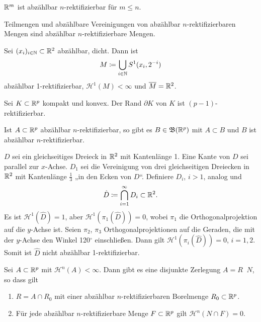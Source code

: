 \documentclass[a4paper,twoside,DIV15,BCOR12mm]{scrbook}
\newcommand{\borel}{\mathfrak B}
\newcommand{\HM}{\mathscr H}
\begin{document}
\begin{beispiele}
\item $\mathbb{R}^m$ ist abzählbar $n$-rektifizierbar für $m \le n$.
\item Teilmengen und abzählbare Vereinigungen von abzählbar $n$-rektifizierbaren Mengen sind abzählbar  $n$-rektifizierbare Mengen.
\item Sei $(x_i)_{i\in \mathbb{N}} \subset \mathbb{R}^2$ abzählbar, dicht. Dann  ist
\[
M \da \bigcup_{i\in\MdN} S^1(x_i,2^{-i})
\]
abzählbar 1-rektifizierbar, $\HM^1(M) <\infty$ und $\overline M = \mathbb{R}^2$.
\item Sei $K\subset \mathbb{R}^p$ kompakt und konvex. Der Rand $\partial K$ von $K$ ist $(p-1)$-rektifizierbar.
\item Ist $A\subset \mathbb{R}^p$ abzählbar $n$-rektifizierbar, so gibt es $B\in \borel(\MdR^p)$ mit $A\subset B$ und $B$ ist abzählbar $n$-rektifizierbar.
\item $D$ sei ein gleichseitiges Dreieck in $\mathbb{R}^2$ mit Kantenlänge 1. Eine Kante von $D$ sei parallel zur $x$-Achse. $D_1$ sei die Vereinigung von drei gleichseitigen Dreiecken in $\mathbb{R}^2$ mit Kantenlänge $\frac13$ „in den Ecken von $D$“. Definiere $D_i$, $i>1$, analog und 
\[
\hat D \da \bigcap_{i=1}^\infty D_i \subset \MdR^2.
\]
Es ist $\HM^1(\hat D)=1$, aber $\HM^1(\pi_1(\hat D))=0$, wobei $\pi_1$ die Orthogonalprojektion auf die $y$-Achse ist. Seien $\pi_2$, $\pi_3$ Orthogonalprojektionen auf die Geraden, die mit der $y$-Achse den Winkel 120$^\circ$ einschließen. Dann gilt $\HM^1(\pi_i(\hat D)) = 0$, $i=1,2$. Somit ist $\hat D$ nicht abzählbar 1-rektifizierbar.
\end{beispiele}

\begin{satz}[Struktursatz]
Sei $A\subset\mathbb{R}^p$ mit $\HM^n(A)<\infty$. Dann gibt es eine disjunkte Zerlegung $A= R \mathop{\dot\cup} N$, so 
dass gilt 
\begin{enumerate}[\quad(a)]
\item $R= A\cap R_0$ mit einer abzählbar $n$-rektifizierbaren Borelmenge $R_0\subset \mathbb{R}^p$.
\item Für jede abzählbar $n$-rektifizierbare Menge $F\subset \mathbb{R}^p$ gilt $\HM^n(N\cap F)=0$.
\end{enumerate}
\end{satz}
\end{document}
